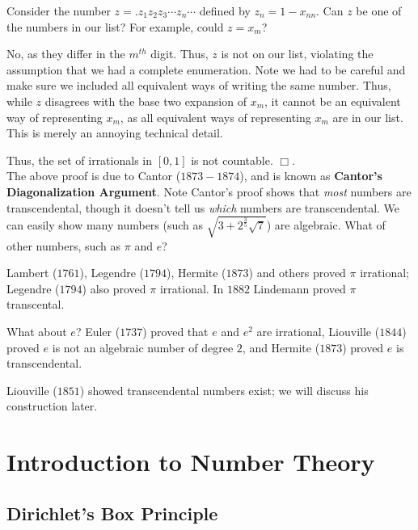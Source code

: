 \documentclass[12pt,letterpaper]{report}
\begin{document}
Consider the number $z = .z_1z_2z_3\cdots z_n\cdots$ defined by
$z_n = 1 - x_{nn}$. Can $z$ be one of the numbers in our list? For
example, could $z = x_m$?

No, as they differ in the $m^{th}$ digit. Thus, $z$ is not on our
list, violating the assumption that we had a complete enumeration.
Note we had to be careful and make sure we included all equivalent
ways of writing the same number. Thus, while $z$ disagrees with
the base two expansion of $x_m$, it cannot be an equivalent way of
representing $x_m$, as all equivalent ways of representing $x_m$
are in our list. This is merely an annoying technical detail.

Thus, the set of irrationals in $[0,1]$ is not countable. $\Box$.
\\

The above proof is due to Cantor ($1873-1874$), and is known as
\textbf{Cantor's Diagonalization Argument}. Note Cantor's proof
shows that \emph{most} numbers are transcendental, though it
doesn't tell us \emph{which} numbers are transcendental. We can
easily show many numbers (such as $\sqrt{3 + 2^{\frac{3}{5}}
\sqrt{7}}$) are algebraic. What of other numbers, such as $\pi$
and $e$?

Lambert ($1761$), Legendre ($1794$), Hermite ($1873$) and others
proved $\pi$ irrational;  Legendre ($1794$) also proved $\pi$
irrational. In $1882$ Lindemann proved $\pi$ transcental.

What about $e$? Euler ($1737$) proved that $e$ and $e^2$ are
irrational, Liouville  ($1844$) proved $e$ is not an algebraic
number of degree $2$, and Hermite ($1873$) proved $e$ is
transcendental.

Liouville ($1851$) showed transcendental numbers exist; we will
discuss his construction later.







\section{Introduction to Number Theory} \setcounter{equation}{0}

\subsection{Dirichlet's Box Principle}
\end{document}
